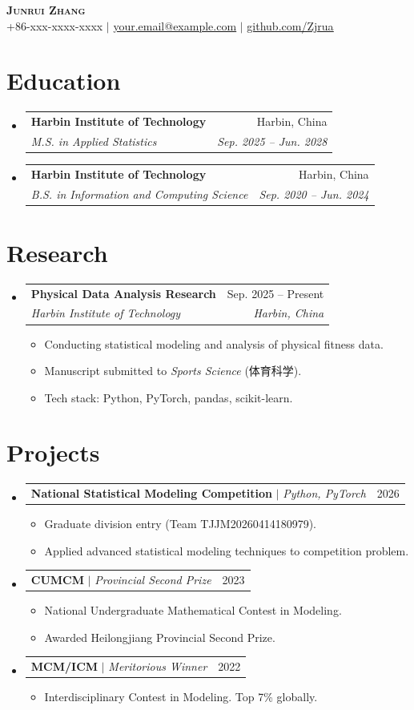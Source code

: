\documentclass[letterpaper,11pt]{article}
\makeatletter
\newcommand{\resumeItem}[1]{
  \item\small{
    {#1 \vspace{-2pt}}
  }
}
\newcommand{\resumeSubheading}[4]{
  \vspace{-2pt}\item
    \begin{tabular*}{0.97\textwidth}[t]{l@{\extracolsep{\fill}}r}
      \textbf{#1} & #2 \\
      \textit{\small#3} & \textit{\small #4} \\
    \end{tabular*}\vspace{-7pt}
}
\newcommand{\resumeProjectHeading}[2]{
    \item
    \begin{tabular*}{0.97\textwidth}{l@{\extracolsep{\fill}}r}
      \small#1 & #2 \\
    \end{tabular*}\vspace{-7pt}
}
\newcommand{\resumeSubHeadingListStart}{\begin{itemize}[leftmargin=0.15in, label={}]}
\newcommand{\resumeSubHeadingListEnd}{\end{itemize}}
\newcommand{\resumeItemListStart}{\begin{itemize}}
\newcommand{\resumeItemListEnd}{\end{itemize}\vspace{-5pt}}
\makeatother
\begin{document}
\begin{center}
    \textbf{\Huge \scshape Junrui Zhang} \\ \vspace{1pt}
    \small +86-xxx-xxxx-xxxx $|$ \href{mailto:your.email@example.com}{\underline{your.email@example.com}} $|$ 
    \href{https://github.com/Zjrua}{\underline{github.com/Zjrua}}
\end{center}

\section{Education}
  \resumeSubHeadingListStart
    \resumeSubheading
      {Harbin Institute of Technology}{Harbin, China}
      {M.S. in Applied Statistics}{Sep. 2025 -- Jun. 2028}
    \resumeSubheading
      {Harbin Institute of Technology}{Harbin, China}
      {B.S. in Information and Computing Science}{Sep. 2020 -- Jun. 2024}
  \resumeSubHeadingListEnd

\section{Research}
  \resumeSubHeadingListStart
    \resumeSubheading
      {Physical Data Analysis Research}{Sep. 2025 -- Present}
      {Harbin Institute of Technology}{Harbin, China}
      \resumeItemListStart
        \resumeItem{Conducting statistical modeling and analysis of physical fitness data.}
        \resumeItem{Manuscript submitted to \textit{Sports Science} (体育科学).}
        \resumeItem{Tech stack: Python, PyTorch, pandas, scikit-learn.}
      \resumeItemListEnd
  \resumeSubHeadingListEnd

\section{Projects}
    \resumeSubHeadingListStart
      \resumeProjectHeading
          {\textbf{National Statistical Modeling Competition} $|$ \emph{Python, PyTorch}}{2026}
          \resumeItemListStart
            \resumeItem{Graduate division entry (Team TJJM20260414180979).}
            \resumeItem{Applied advanced statistical modeling techniques to competition problem.}
          \resumeItemListEnd
      \resumeProjectHeading
          {\textbf{CUMCM} $|$ \emph{Provincial Second Prize}}{2023}
          \resumeItemListStart
            \resumeItem{National Undergraduate Mathematical Contest in Modeling.}
            \resumeItem{Awarded Heilongjiang Provincial Second Prize.}
          \resumeItemListEnd
      \resumeProjectHeading
          {\textbf{MCM/ICM} $|$ \emph{Meritorious Winner}}{2022}
          \resumeItemListStart
            \resumeItem{Interdisciplinary Contest in Modeling. Top 7\% globally.}
          \resumeItemListEnd
    \resumeSubHeadingListEnd
\end{document}
